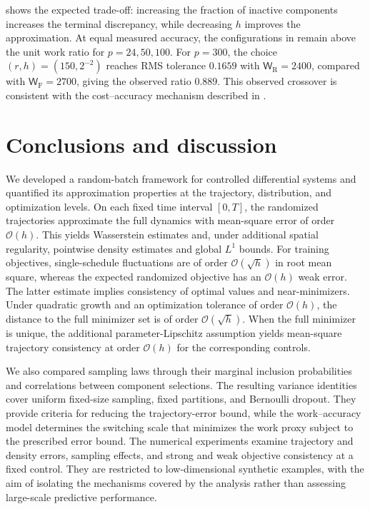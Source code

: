 \documentclass[twoside,11pt]{article}
\theoremstyle{plain}
\begin{document}
 shows the expected trade-off: increasing
the fraction of inactive components increases the terminal discrepancy,
while decreasing $h$ improves the approximation. At equal measured accuracy,
the configurations in  remain above the
unit work ratio for $p=24,50,100$. For $p=300$, the choice
$(r,h)=(150,2^{-2})$ reaches RMS tolerance $0.1659$ with
$\mathsf W_{\mathrm R}=2400$, compared with
$\mathsf W_{\mathrm F}=2700$, giving the observed ratio $0.889$.
This observed crossover is consistent with the cost--accuracy
mechanism described in .


\section{Conclusions and discussion}\label{sec:conclusions}

We developed a random-batch framework for controlled differential systems
and quantified its approximation properties at the trajectory,
distribution, and optimization levels. On each fixed time interval
$[0,T]$, the randomized trajectories approximate the full dynamics with
mean-square error of order $\mathcal O(h)$. This yields Wasserstein
estimates and, under additional spatial regularity, pointwise density
estimates and global $L^1$ bounds. For training objectives, single-schedule
fluctuations are of order $\mathcal O(\sqrt h)$ in root mean square,
whereas the expected randomized objective has an $\mathcal O(h)$ weak
error. The latter estimate implies consistency of optimal values and
near-minimizers. Under quadratic growth and an optimization tolerance of
order $\mathcal O(h)$, the distance to the full minimizer set is of order
$\mathcal O(\sqrt h)$. When the full minimizer is unique, the additional
parameter-Lipschitz assumption yields mean-square trajectory consistency
at order $\mathcal O(h)$ for the corresponding controls.

We also compared sampling laws through their marginal inclusion
probabilities and correlations between component selections. The resulting
variance identities cover uniform fixed-size sampling, fixed partitions,
and Bernoulli dropout. They provide criteria for reducing the
trajectory-error bound, while the work--accuracy model determines the
switching scale that minimizes the work proxy subject to the prescribed
error bound. The numerical experiments examine trajectory and density errors, sampling
effects, and strong and weak objective consistency at a fixed control.
They are restricted to low-dimensional synthetic examples,
with the aim of isolating the mechanisms covered by the analysis rather
than assessing large-scale predictive performance.
\end{document}

